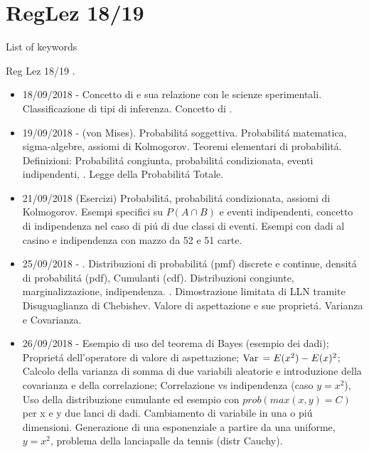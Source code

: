 \section{RegLez 18/19}

\begin{frame}[allowframebreaks]{List of keywords}
\listofkeywords
\end{frame}

\begin{frame}[allowframebreaks]{Reg Lez 18/19}
\cite{reg18}.
\begin{itemize}
\item 18/09/2018 - Concetto di  e sua relazione con le scienze sperimentali. Classificazione di tipi di inferenza. Concetto di .
\item 19/09/2018 -  (von Mises). Probabilit\'a soggettiva. Probabilit\'a matematica, sigma-algebre, assiomi di Kolmogorov. Teoremi elementari di probabilit\'a. Definizioni: Probabilit\'a congiunta, probabilit\'a condizionata, eventi indipendenti, . Legge della Probabilit\'a Totale.
\item 21/09/2018 (Esercizi) Probabilit\'a, probabilit\'a condizionata, assiomi di Kolmogorov. Esempi specifici su $P(A \cap B)$ e eventi indipendenti, concetto di indipendenza nel caso di pi\'u di due classi di eventi. Esempi con dadi al casino e indipendenza con mazzo da 52 e 51 carte.
\item 25/09/2018 - . Distribuzioni di probabilit\'a (pmf) discrete e continue, densit\'a di probabilit\'a (pdf), Cumulanti (cdf). Distribuzioni congiunte, marginalizzazione, indipendenza. . Dimostrazione limitata di LLN tramite Disuguaglianza di Chebishev. Valore di aspettazione e sue propriet\'a. Varianza e Covarianza.
\item 26/09/2018 - Esempio di uso del teorema di Bayes (esempio dei dadi); Propriet\'a dell'operatore di valore di aspettazione; $\operatorname{Var}{}=E(x^2)-E(x)^2$; Calcolo della varianza di somma di due variabili aleatorie e introduzione della covarianza e della correlazione; Correlazione vs indipendenza (caso $y=x^2$), Uso della distribuzione cumulante ed esempio con $prob(max(x,y)=C)$ per x e y due lanci di dadi. Cambiamento di variabile in una o pi\'u dimensioni. Generazione di una esponenziale a partire da una uniforme, $y=x^2$, problema della lanciapalle da tennis (distr Cauchy).

\end{itemize}
\end{frame}
